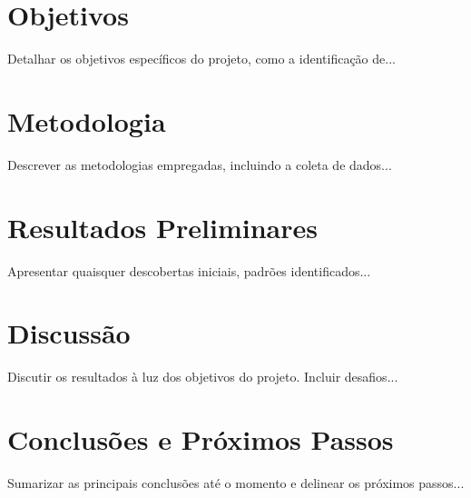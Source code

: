 \documentclass[relatorio,oneside]{iagtese} %
\begin{document}


\titulo %

\assinatura %



\tableofcontents 			%



\chapter{Objetivos}
Detalhar os objetivos específicos do projeto, como a identificação de...

\chapter{Metodologia}
Descrever as metodologias empregadas, incluindo a coleta de dados...

\chapter{Resultados Preliminares}
Apresentar quaisquer descobertas iniciais, padrões identificados...

\chapter{Discussão}
Discutir os resultados à luz dos objetivos do projeto. Incluir desafios...

\chapter{Conclusões e Próximos Passos}
Sumarizar as principais conclusões até o momento e delinear os próximos passos...

\end{document}
